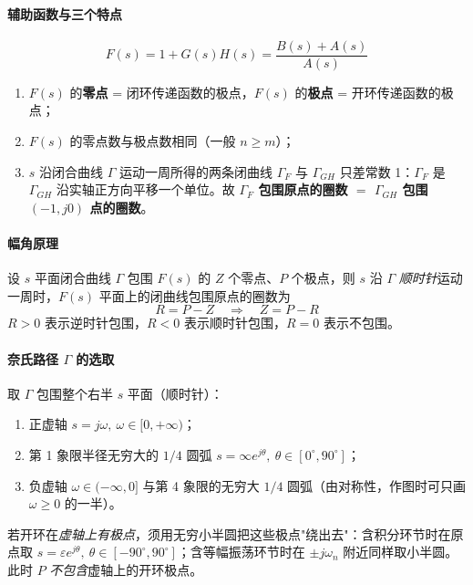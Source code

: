 \paragraph{辅助函数与三个特点}
\[
F(s)=1+G(s)H(s)=\frac{B(s)+A(s)}{A(s)}
\]
\begin{enumerate}
    \item $F(s)$ 的\textbf{零点} = 闭环传递函数的极点，$F(s)$ 的\textbf{极点} = 开环传递函数的极点；
    \item $F(s)$ 的零点数与极点数相同（一般 $n\ge m$）；
    \item $s$ 沿闭合曲线 $\Gamma$ 运动一周所得的两条闭曲线 $\Gamma_F$ 与 $\Gamma_{GH}$ 只差常数 1：$\Gamma_F$ 是 $\Gamma_{GH}$ 沿实轴正方向平移一个单位。故 \textbf{$\Gamma_F$ 包围原点的圈数 $=$ $\Gamma_{GH}$ 包围 $(-1,j0)$ 点的圈数}。
\end{enumerate}

\paragraph{幅角原理}
设 $s$ 平面闭合曲线 $\Gamma$ 包围 $F(s)$ 的 $Z$ 个零点、$P$ 个极点，则 $s$ 沿 $\Gamma$ \emph{顺时针}运动一周时，$F(s)$ 平面上的闭曲线包围原点的圈数为
\[
R=P-Z\quad\Longrightarrow\quad Z=P-R
\]
$R>0$ 表示逆时针包围，$R<0$ 表示顺时针包围，$R=0$ 表示不包围。

\paragraph{奈氏路径 $\Gamma$ 的选取}
取 $\Gamma$ 包围整个右半 $s$ 平面（顺时针）：
\begin{enumerate}
    \item 正虚轴 $s=j\omega,\ \omega\in[0,+\infty)$；
    \item 第 1 象限半径无穷大的 $1/4$ 圆弧 $s=\infty e^{j\theta},\ \theta\in[0^\circ,90^\circ]$；
    \item 负虚轴 $\omega\in(-\infty,0]$ 与第 4 象限的无穷大 $1/4$ 圆弧（由对称性，作图时可只画 $\omega\ge0$ 的一半）。
\end{enumerate}
若开环在\emph{虚轴上有极点}，须用无穷小半圆把这些极点"绕出去"：含积分环节时在原点取 $s=\varepsilon e^{j\theta},\ \theta\in[-90^\circ,90^\circ]$；含等幅振荡环节时在 $\pm j\omega_n$ 附近同样取小半圆。此时 $P$ \emph{不包含}虚轴上的开环极点。

